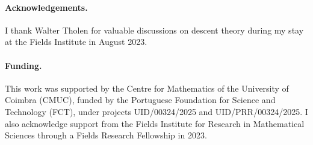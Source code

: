 \documentclass[11pt,a4paper]{article}
\numberwithin{equation}{section}
\theoremstyle{definition}
\theoremstyle{remark}
\begin{document}
\paragraph{Acknowledgements.}
I thank Walter Tholen for valuable discussions on descent theory during
my stay at the Fields Institute in August 2023.

\paragraph{Funding.}
This work was supported by the Centre for Mathematics of the
University of Coimbra (CMUC), funded by the Portuguese Foundation for
Science and Technology (FCT), under projects UID/00324/2025 and
UID/PRR/00324/2025.
I also acknowledge support from the Fields Institute for Research in
Mathematical Sciences through a Fields Research Fellowship in 2023.
\end{document}
